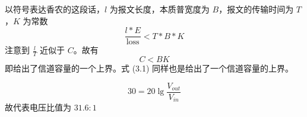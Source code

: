 \begin{nproblem}[3.24]
\end{nproblem}
\begin{nsolution}
    以符号表达香农的这段话，$l$ 为报文长度，本质普宽度为 $B$，报文的传输时间为 $T$，$K$ 为常数
    \[\frac{l*E}{\text{loss}}< T*B*K\]
    注意到 $\frac{l}{T}$ 近似于 $C$。故有
    \[C< BK\]
    即给出了信道容量的一个上界。式 (3.1) 同样也是给出了一个信道容量的上界。 
\end{nsolution}

\begin{nproblem}[3.26]
\end{nproblem}
\begin{nsolution}
    \[30=20\lg\frac{V_{out}}{V_{in}}\]
    故代表电压比值为 $31.6:1$
\end{nsolution}

